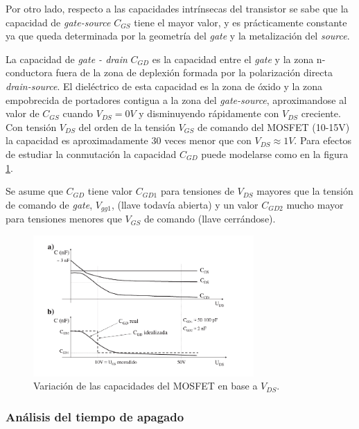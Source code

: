 \documentclass[10pt, a4paper]{article}
\begin{document}
Por otro lado, respecto a las capacidades intrínsecas del transistor se sabe que
la capacidad de \emph{gate-source} $C_{GS}$ tiene el mayor valor, y es
prácticamente constante ya que queda determinada por la geometría del
\emph{gate} y la metalización del \emph{source}.

La capacidad de \emph{gate - drain}  $C_{GD}$ es la capacidad entre el
\emph{gate} y la zona n- conductora fuera de la zona de deplexión formada por la
polarización directa \emph{drain-source}. El dieléctrico de esta capacidad es la
zona de óxido y la zona empobrecida de portadores contigua a la zona del
\emph{gate-source}, aproximandose al valor de $C_{GS}$ cuando $V_{DS}= 0V$ y
disminuyendo rápidamente con $V_{DS}$ creciente. Con tensión $V_{DS}$ del orden
de la tensión $V_{GS}$ de comando del MOSFET (10-15V) la capacidad es
aproximadamente 30 veces menor  que con $V_{DS}\approx1V$. Para efectos de
estudiar la conmutación la capacidad $C_{GD}$ puede modelarse como en la figura
\ref{aprox_CGD}.

Se asume que $C_{GD}$ tiene valor $C_{GD1}$ para tensiones de $V_{DS}$ mayores
que la tensión de comando de \emph{gate}, $V_{gg1}$, (llave todavía abierta) y
un valor $C_{GD2}$ mucho mayor para tensiones menores que $V_{GS}$ de comando
(llave cerrándose)\cite{Mohan1989}.

\begin{figure}[h!]
	\begin{center}
		\includegraphics[width=0.75\textwidth]{Capacitor_vs_Vds.pdf}
		\caption{Variación de las capacidades del MOSFET en base a $V_{DS}$.}
		\label{aprox_CGD}
	\end{center}
\end{figure}
\FloatBarrier

\subsubsection{Análisis del tiempo de apagado}
\end{document}
